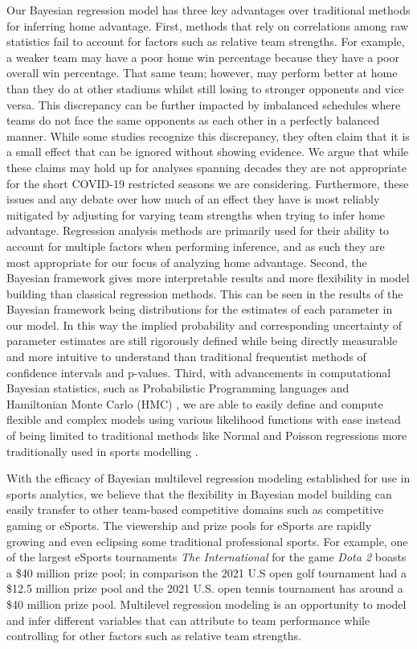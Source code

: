 Our Bayesian regression model has three key advantages over traditional methods for inferring home advantage. First, methods that rely on correlations among raw statistics fail to account for factors such as relative team strengths. For example, a weaker team may have a poor home win percentage because they have a poor overall win percentage. That same team; however, may perform better at home than they do at other stadiums whilst still losing to stronger opponents and vice versa. This discrepancy can be further impacted by imbalanced schedules where teams do not face the same opponents as each other in a perfectly balanced manner. While some studies recognize this discrepancy, they often claim that it is a small effect that can be ignored \cite{Pollard2005a} without showing evidence. We argue that while these claims may hold up for analyses spanning decades they are not appropriate for the short COVID-19 restricted seasons we are considering. Furthermore, these issues and any debate over how much of an effect they have is most reliably mitigated by adjusting for varying team strengths when trying to infer home advantage. Regression analysis methods are primarily used for their ability to account for multiple factors when performing inference, and as such they are most appropriate for our focus of analyzing home advantage. Second, the Bayesian framework gives more interpretable results and more flexibility in model building than classical regression methods. This can be seen in the results of the Bayesian framework being distributions for the estimates of each parameter in our model. In this way the implied probability and corresponding uncertainty of parameter estimates are still rigorously defined while being directly measurable and more intuitive to understand than traditional frequentist methods of confidence intervals and p-values. Third, with advancements in computational Bayesian statistics, such as Probabilistic Programming languages \cite{pymc3} and Hamiltonian Monte Carlo (HMC) \cite{Betancourt2017}, we are able to easily define and compute flexible and complex models using various likelihood functions with ease instead of being limited to traditional methods like Normal and Poisson regressions more traditionally used in sports modelling \cite{Lopez2018} \cite{Glickman1998} \cite{Karlis2003} \cite{Baio2010} \cite{Benz2020}.

With the efficacy of Bayesian multilevel regression modeling established for use in sports analytics, we believe that the flexibility in Bayesian model building can easily transfer to other team-based competitive domains such as competitive gaming or eSports. The viewership and prize pools for eSports are rapidly growing and even eclipsing some traditional professional sports. For example, one of the largest eSports tournaments \textit{The International} for the game \textit{Dota 2} boasts a \$40 million prize pool; in comparison the 2021 U.S open golf tournament had a \$12.5 million prize pool and the 2021 U.S. open tennis tournament has around a \$40 million prize pool. Multilevel regression modeling is an opportunity to model and infer different variables that can attribute to team performance while controlling for other factors such as relative team strengths.

